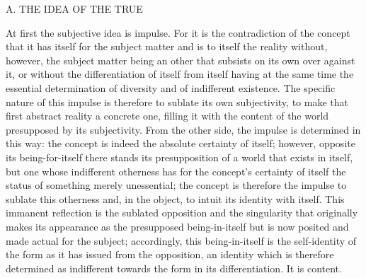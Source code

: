 A. THE IDEA OF THE TRUE

At first the subjective idea is impulse.
For it is the contradiction of the concept
that it has itself for the subject matter
and is to itself the reality without, however,
the subject matter being an other that subsists
on its own over against it,
or without the differentiation
of itself from itself
having at the same time
the essential determination of diversity
and of indifferent existence.
The specific nature of this impulse is therefore
to sublate its own subjectivity,
to make that first abstract reality a concrete one,
filling it with the content of the world
presupposed by its subjectivity.
From the other side, the impulse is determined in this way:
the concept is indeed the absolute certainty of itself;
however, opposite its being-for-itself
there stands its presupposition of a world
that exists in itself,
but one whose indifferent otherness
has for the concept's certainty of itself
the status of something merely unessential;
the concept is therefore the impulse
to sublate this otherness
and, in the object, to intuit
its identity with itself.
This immanent reflection is
the sublated opposition
and the singularity that originally
makes its appearance as
the presupposed being-in-itself
but is now posited and made actual for the subject;
accordingly, this being-in-itself is
the self-identity of the form
as it has issued from the opposition,
an identity which is therefore determined as
indifferent towards the form
in its differentiation.
It is content.

